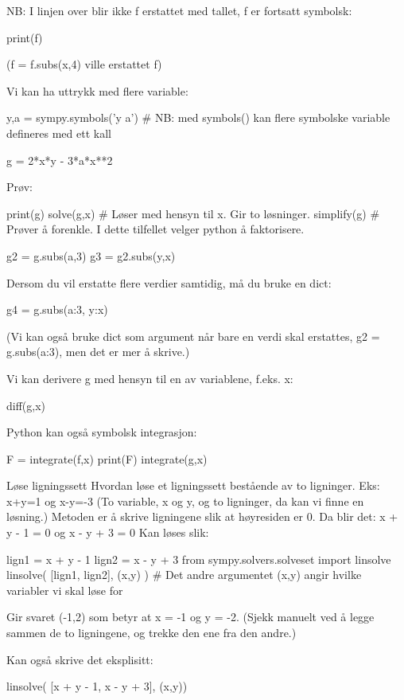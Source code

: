 NB: I linjen over blir ikke f erstattet med tallet, f er fortsatt symbolsk: 
\begin{usncodebox}
print(f)
\end{usncodebox}
(f = f.subs(x,4) ville erstattet f)

Vi kan ha uttrykk med flere variable: 
\begin{usncodebox}
y,a = sympy.symbols('y a')    # NB: med symbols() kan flere symbolske variable defineres med ett kall 

g = 2*x*y - 3*a*x**2
\end{usncodebox}

Prøv:
\begin{usncodebox}
print(g)
solve(g,x)        # Løser med hensyn til x. Gir to løsninger. 
simplify(g)       # Prøver å forenkle. I dette tilfellet velger python å faktorisere. 

g2 = g.subs(a,3)
g3 = g2.subs(y,x)
\end{usncodebox}
Dersom du vil erstatte flere verdier samtidig, må du bruke en dict: 
\begin{usncodebox}
g4 = g.subs({a:3, y:x})
\end{usncodebox}
(Vi kan også bruke dict som argument når bare en verdi skal erstattes, g2 = g.subs({a:3}), men det er mer å skrive.) 

Vi kan derivere g med hensyn til en av variablene, f.eks. x:
\begin{usncodebox}
diff(g,x)
\end{usncodebox}

Python kan også symbolsk integrasjon:
\begin{usncodebox}
F = integrate(f,x) 
print(F)
integrate(g,x)
\end{usncodebox}

Løse ligningssett 
Hvordan løse et ligningssett bestående av to ligninger.
Eks: x+y=1 og x-y=-3
(To variable, x og y, og to ligninger, da kan vi finne en løsning.)
Metoden er å skrive ligningene slik at høyresiden er 0.
Da blir det:
x + y - 1 = 0  og  x - y + 3 = 0
Kan løses slik:
\begin{usncodebox}
lign1 = x + y - 1
lign2 = x - y + 3
from sympy.solvers.solveset import linsolve
linsolve( [lign1, lign2], (x,y) )     # Det andre argumentet (x,y) angir hvilke variabler vi skal løse for
\end{usncodebox}
Gir svaret {(-1,2)} som betyr at x = -1 og y = -2. (Sjekk manuelt ved å legge sammen de to ligningene, og trekke den ene fra den andre.) 

Kan også skrive det eksplisitt:
\begin{usncodebox}
linsolve( [x + y - 1, x - y + 3], (x,y))
\end{usncodebox}

